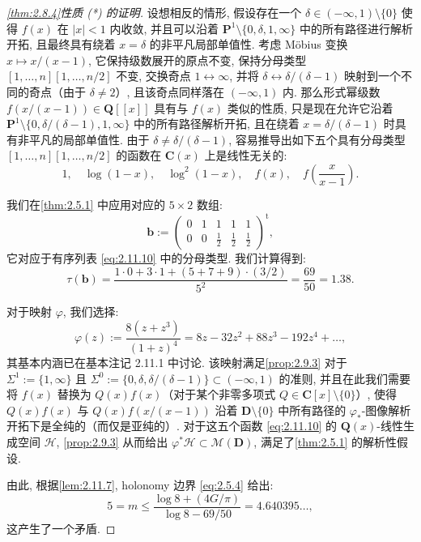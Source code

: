 \begin{proof}[\autoref{thm:2.8.4}性质 (*) 的证明]
设想相反的情形, 假设存在一个 \(\delta \in (-\infty,1) \setminus \{0\}\) 使得 \(f(x)\) 在 \(|x| < 1\) 内收敛, 并且可以沿着 \(\mathbf{P}^1 \setminus \{0,\delta,1,\infty\}\) 中的所有路径进行解析开拓, 且最终具有绕着 \(x = \delta\) 的非平凡局部单值性.
考虑 Möbius 变换 \(x \mapsto x/(x-1)\), 它保持级数展开的原点不变, 保持分母类型 \([1,\dots,n][1,\dots,n/2]\) 不变, 交换奇点 \(1 \leftrightarrow \infty\), 并将 \(\delta \leftrightarrow \delta/(\delta-1)\) 映射到一个不同的奇点（由于 \(\delta \neq 2\)）, 且该奇点同样落在 \((-\infty,1)\) 内.
那么形式幂级数 \(f(x/(x-1)) \in \mathbf{Q}[\![x]\!]\) 具有与 \(f(x)\) 类似的性质, 只是现在允许它沿着 \(\mathbf{P}^1 \setminus \{0,\delta/(\delta-1),1,\infty\}\) 中的所有路径解析开拓, 且在绕着 \(x = \delta/(\delta-1)\) 时具有非平凡的局部单值性.
由于 \(\delta \neq \delta/(\delta-1)\), 容易推导出如下五个具有分母类型 \([1,\dots,n][1,\dots,n/2]\) 的函数在 \(\mathbf{C}(x)\) 上是线性无关的:
\begin{equation}\label{eq:2.11.10}
1, \quad \log(1-x), \quad \log^2(1-x), \quad f(x), \quad f\left(\frac{x}{x-1}\right).
\end{equation}

我们在\autoref{thm:2.5.1} 中应用对应的 \(5 \times 2\) 数组:
\[ \mathbf{b} := \left( \begin{array}{ccccc} 0 & 1 & 1 & 1 & 1 \\ 0 & 0 & \frac{1}{2} & \frac{1}{2} & \frac{1}{2} \end{array} \right)^{\mathrm{t}}, \]
它对应于有序列表 \eqref{eq:2.11.10} 中的分母类型.
我们计算得到:
\begin{equation}\label{eq:2.11.11}
\tau(\mathbf{b}) = \frac{1 \cdot 0 + 3 \cdot 1 + (5 + 7 + 9) \cdot (3/2)}{5^2} = \frac{69}{50} = 1.38.
\end{equation}

对于映射 \(\varphi\), 我们选择:
\[ \varphi(z) := \frac{8(z+z^3)}{(1+z)^4} = 8z - 32z^2 + 88z^3 - 192z^4 + \dots, \]
其基本内涵已在基本注记 2.11.1 中讨论. 该映射满足\autoref{prop:2.9.3} 对于 \(\Sigma^1 := \{1, \infty\}\) 且 \(\Sigma^0 := \{0, \delta, \delta/(\delta - 1)\} \subset (-\infty, 1)\) 的准则, 并且在此我们需要将 \(f(x)\) 替换为 \(Q(x)f(x)\)（对于某个非零多项式 \(Q \in \mathbf{C}[x] \setminus \{0\}\)）, 使得 \(Q(x)f(x)\) 与 \(Q(x)f(x/(x-1))\) 沿着 \(\mathbf{D} \setminus \{0\}\) 中所有路径的 \(\varphi_*\)-图像解析开拓下是全纯的（而仅是亚纯的）. 
对于这五个函数 \eqref{eq:2.11.10} 的 \(\mathbf{Q}(x)\)-线性生成空间 \(\mathcal{H}\), \autoref{prop:2.9.3} 从而给出 \(\varphi^*\mathcal{H} \subset \mathcal{M}(\mathbf{D})\), 满足了\autoref{thm:2.5.1} 的解析性假设.

由此, 根据\autoref{lem:2.11.7}, holonomy 边界 \eqref{eq:2.5.4} 给出:
\[ 5 = m \le \frac{\log 8 + (4G/\pi)}{\log 8 - 69/50} = 4.640395\dots, \]
这产生了一个矛盾.
\end{proof}

